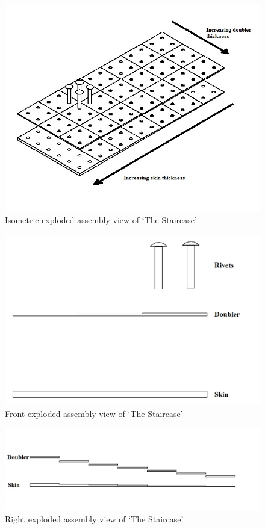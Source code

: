 \documentclass[12pt]{article}
\begin{document}
\begin{figure}[h!]
  \centering
  	\includegraphics[width=\textwidth]{Steps_iso}
  \caption{Isometric exploded assembly view of `The Staircase'}
  \label{fig:steps_iso}
\end{figure}

\begin{figure}[h!]
  \centering
  	\includegraphics[width=\textwidth]{Steps_front}
  \caption{Front exploded assembly view of `The Staircase'}
  \label{fig:steps_front}
\end{figure}

\begin{figure}[h!]
  \centering
  	\includegraphics[width=\textwidth]{Steps_right}
  \caption{Right exploded assembly view of `The Staircase'}
  \label{fig:steps_right}
\end{figure}
\end{document}
